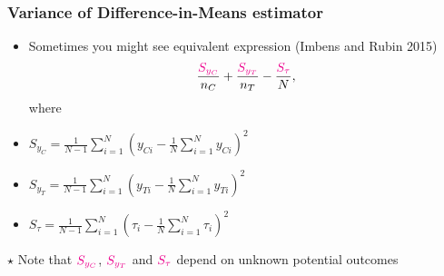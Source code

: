 \documentclass[table, xcolor = {dvipsnames}, 9pt]{beamer}
\theoremstyle{plain}
\newcommand{\mh}[1]{{\color{magenta}{#1}}}
\begin{document}
\begin{frame}
\frametitle{Variance of Difference-in-Means estimator}
\begin{itemize}
\item Sometimes you might see equivalent expression (Imbens and Rubin 2015)
\begin{equation*}
\dfrac{\mh{S_{y_C}}}{n_C} + \dfrac{\mh{S_{y_T}}}{n_T} - \dfrac{\mh{S_{\tau}}}{N},
\end{equation*}
where
\item[] $S_{y_C} = \frac{1}{N - 1} \sum \limits_{i = 1}^N \left(y_{Ci} - \frac{1}{N} \sum \limits_{i = 1}^N y_{Ci}\right)^2$
\item[] $S_{y_T} = \frac{1}{N - 1} \sum \limits_{i = 1}^N \left(y_{Ti} - \frac{1}{N} \sum \limits_{i = 1}^N y_{Ti}\right)^2$ 
\item[] $S_{\tau} = \frac{1}{N - 1} \sum \limits_{i = 1}^N \left(\tau_i - \frac{1}{N} \sum \limits_{i = 1}^N \tau_i\right)^2$
\end{itemize} \pause
\vspace{1em}
$\star$ Note that $\mh{S_{y_C}}$, $\mh{S_{y_T}}$ and $\mh{S_{\tau}}$ depend on unknown potential outcomes
\end{frame}
\end{document}
